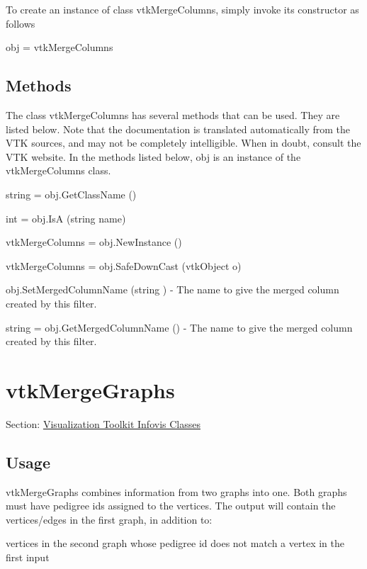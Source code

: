 To create an instance of class vtk\-Merge\-Columns, simply invoke its constructor as follows \begin{DoxyVerb}  obj = vtkMergeColumns
\end{DoxyVerb}
 \hypertarget{vtkwidgets_vtkxyplotwidget_Methods}{}\subsection{Methods}\label{vtkwidgets_vtkxyplotwidget_Methods}
The class vtk\-Merge\-Columns has several methods that can be used. They are listed below. Note that the documentation is translated automatically from the V\-T\-K sources, and may not be completely intelligible. When in doubt, consult the V\-T\-K website. In the methods listed below, {\ttfamily obj} is an instance of the vtk\-Merge\-Columns class. 
\begin{DoxyItemize}
\item {\ttfamily string = obj.\-Get\-Class\-Name ()}  
\item {\ttfamily int = obj.\-Is\-A (string name)}  
\item {\ttfamily vtk\-Merge\-Columns = obj.\-New\-Instance ()}  
\item {\ttfamily vtk\-Merge\-Columns = obj.\-Safe\-Down\-Cast (vtk\-Object o)}  
\item {\ttfamily obj.\-Set\-Merged\-Column\-Name (string )} -\/ The name to give the merged column created by this filter.  
\item {\ttfamily string = obj.\-Get\-Merged\-Column\-Name ()} -\/ The name to give the merged column created by this filter.  
\end{DoxyItemize}\hypertarget{vtkinfovis_vtkmergegraphs}{}\section{vtk\-Merge\-Graphs}\label{vtkinfovis_vtkmergegraphs}
Section\-: \hyperlink{sec_vtkinfovis}{Visualization Toolkit Infovis Classes} \hypertarget{vtkwidgets_vtkxyplotwidget_Usage}{}\subsection{Usage}\label{vtkwidgets_vtkxyplotwidget_Usage}
vtk\-Merge\-Graphs combines information from two graphs into one. Both graphs must have pedigree ids assigned to the vertices. The output will contain the vertices/edges in the first graph, in addition to\-:


\begin{DoxyItemize}
\item vertices in the second graph whose pedigree id does not match a vertex in the first input
\end{DoxyItemize}


